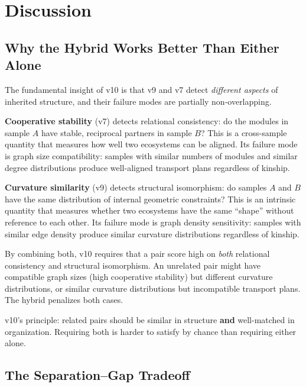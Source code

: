\documentclass{../yalumba}
\begin{document}
\section{Discussion}
\label{sec:discussion}

\subsection{Why the Hybrid Works Better Than Either Alone}

The fundamental insight of v10 is that v9 and v7 detect \emph{different
aspects} of inherited structure, and their failure modes are partially
non-overlapping.

\textbf{Cooperative stability} (v7) detects relational consistency: do
the modules in sample $A$ have stable, reciprocal partners in sample $B$?
This is a cross-sample quantity that measures how well two ecosystems
can be aligned.  Its failure mode is graph size compatibility: samples
with similar numbers of modules and similar degree distributions produce
well-aligned transport plans regardless of kinship.

\textbf{Curvature similarity} (v9) detects structural isomorphism: do
samples $A$ and $B$ have the same distribution of internal geometric
constraints?  This is an intrinsic quantity that measures whether two
ecosystems have the same ``shape'' without reference to each other.  Its
failure mode is graph density sensitivity: samples with similar edge
density produce similar curvature distributions regardless of kinship.

By combining both, v10 requires that a pair score high on \emph{both}
relational consistency and structural isomorphism.  An unrelated pair
might have compatible graph sizes (high cooperative stability) but
different curvature distributions, or similar curvature distributions
but incompatible transport plans.  The hybrid penalizes both cases.

\begin{pullquote}
v10's principle: related pairs should be similar in structure
\textbf{and} well-matched in organization.  Requiring both is harder
to satisfy by chance than requiring either alone.
\end{pullquote}

\subsection{The Separation--Gap Tradeoff}
\end{document}

